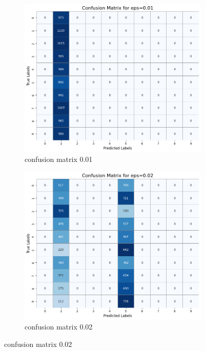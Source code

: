 \documentclass[11pt,onside]{article}
\begin{document}
\begin{figure}[h]
  \centering
  \begin{subfigure}[b]{0.49\textwidth}
    \centering
    \includegraphics[width=\textwidth]{V2_images/confusion_matrix_eps_0.01.png}
    \caption{confusion matrix 0.01}
    \label{fig:image1}
  \end{subfigure}
  \hfill
  \begin{subfigure}[b]{0.49\textwidth}
    \centering
    \includegraphics[width=\textwidth]{V2_images/confusion_matrix_eps_0.02.png}
    \caption{confusion matrix 0.02}
    \label{fig:image2}
  \end{subfigure}

  \label{fig:images}
\end{figure}
\end{document}
